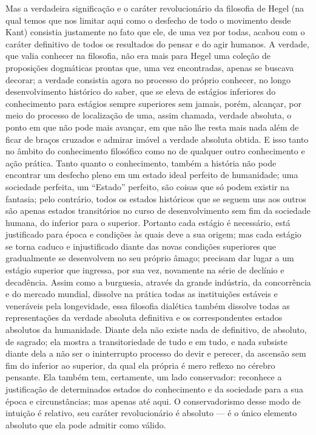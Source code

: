 Mas a verdadeira significação e o caráter revolucionário da filosofia
de Hegel (na
qual temos que nos limitar aqui como o desfecho de todo o movimento
desde Kant)
consistia justamente no fato que ele, de uma vez por todas, acabou com o
caráter definitivo de todos os resultados do pensar e do agir humanos. A
verdade, que valia conhecer na filosofia, não era mais
para Hegel uma
coleção de proposições dogmáticas prontas que, uma vez encontradas,
apenas se buscava decorar; a verdade consistia agora no processo do
próprio conhecer, no longo desenvolvimento histórico do saber,
que se eleva de estágios inferiores do 
conhecimento para estágios sempre superiores sem jamais, porém,
alcançar, por meio do processo de localização de uma, assim chamada, verdade absoluta, o ponto em que não pode mais avançar, em que não lhe resta
mais nada além de ficar de braços cruzados e admirar imóvel a verdade
absoluta obtida. E isso tanto no âmbito do conhecimento filosófico como no
de qualquer outro conhecimento e ação prática. Tanto quanto o
conhecimento, também a história não pode encontrar um desfecho pleno
em um estado ideal perfeito de 
humanidade; uma sociedade perfeita, um ``Estado'' perfeito, são coisas
que só podem existir na fantasia; pelo contrário, todos os estados
históricos que se seguem uns aos outros são apenas estados transitórios
no curso de desenvolvimento sem fim da sociedade humana, 
do inferior para o superior. Portanto cada estágio é necessário, está
justificado para época e condições às quais deve a sua origem; mas cada estágio se %
torna caduco e injustificado diante das novas condições superiores que
gradualmente se desenvolvem no seu próprio âmago; precisam dar lugar a
um estágio superior que ingressa, por sua vez, novamente na série de
declínio e decadência. Assim como a burguesia, através da grande
indústria, da concorrência e do mercado mundial, dissolve na prática
todas as instituições estáveis e veneráveis pela longevidade, essa
filosofia dialética também dissolve todas as representações da verdade
absoluta definitiva e os correspondentes estados absolutos da
humanidade. Diante dela não existe nada de definitivo, de absoluto, de
sagrado; ela mostra a transitoriedade de tudo e em tudo, e nada subsiste
diante dela a não ser o ininterrupto processo do devir e perecer, da
ascensão sem fim do inferior ao superior, da qual ela própria é mero
reflexo no cérebro pensante. Ela também tem, certamente, um lado
conservador: reconhece a justificação de determinados estados do
conhecimento e da sociedade para a sua época e circunstâncias; mas
apenas até aqui. O conservadorismo desse modo de intuição
é relativo, seu caráter revolucionário é 
absoluto --- é o único elemento absoluto que ela pode admitir como válido.\est\


